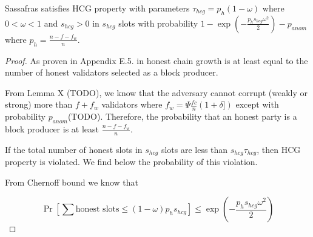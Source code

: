 \begin{theorem}
	Sassafras satisfies HCG property with parameters $\tau_{hcg} = p_h(1-\omega)$ where $0 < \omega < 1$ and $s_{hcg} > 0$ in $s_{hcg}$ slots  with probability $1-\exp(-\frac{ p_h s_{hcg} \omega^2}{2}) - p_{anom}$ where $ p_h = \frac{n - f - f_w}{n} $.
\end{theorem}
\begin{proof}
	As proven in  Appendix E.5. in \cite{genesis} honest chain growth is at least equal to the number of honest validators selected as a block producer.
	
	From Lemma X (TODO), we know that the adversary cannot corrupt (weakly or strong) more than $f + f_w $ validators where $ f_w  =  \Psi\frac{fc}{n}(1+\delta])$ except with probability $ p_{anom} $(TODO).
	Therefore, the probability that an honest party is a block producer is at least $ \frac{n - f - f_w}{n} $.
	
	If the total number of honest slots in $ s_{hcg} $ slots are less than  $s_{hcg}\tau_{hcg}$, then HCG property is violated. 
	We find below the probability of this violation. 
	
	From Chernoff bound we know that
	
	$$\Pr[\sum \text{honest slots} \leq  (1-\omega) p_h s_{hcg}] \leq \exp(-\frac{p_h s_{hcg} \omega^2}{2})$$
	
\end{proof}


\begin{theorem}
\end{theorem}




